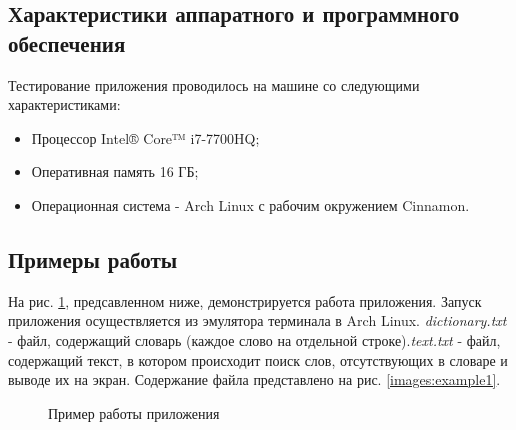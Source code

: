 \documentclass[a4paper,12pt]{article}
\begin{document}
\subsection{Характеристики аппаратного и программного обеспечения}
Тестирование приложения проводилось на машине со следующими характеристиками:\\
\begin{itemize}
\item Процессор Intel® Core™ i7-7700HQ;
\item Оперативная память 16 ГБ;
\item Операционная система - Arch Linux с рабочим окружением Cinnamon.
\end{itemize}

\newpage
\subsection{Примеры работы}
На рис. \ref{images:example}, предсавленном ниже, демонстрируется работа приложения. Запуск приложения осуществляется из эмулятора терминала в Arch Linux.
\textit{dictionary.txt} - файл, содержащий словарь (каждое слово на отдельной строке).\textit{text.txt} - файл, содержащий текст, в котором происходит поиск слов, отсутствующих в словаре и выводе их на экран. Содержание файла представлено на рис. \ref{images:example1}.
\begin{figure}[h]
\caption{Пример работы приложения}
\label{images:example}
\end{figure}
\end{document}
